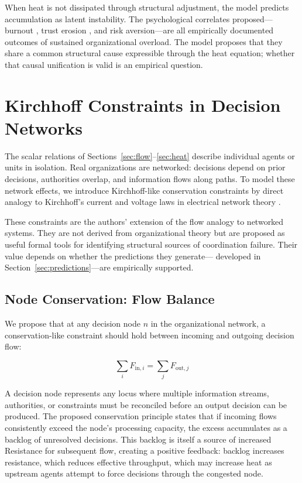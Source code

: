 \documentclass[12pt]{article}
\begin{document}
When heat is not dissipated through structural adjustment, the model
predicts accumulation as latent instability. The psychological correlates
proposed---burnout \citep{maslach1981measurement}, trust erosion
\citep{mayer1995integrative}, and risk aversion---are all empirically
documented outcomes of sustained organizational overload. The model proposes
that they share a common structural cause expressible through the heat
equation; whether that causal unification is valid is an empirical question.

\section{Kirchhoff Constraints in Decision Networks}
\label{sec:kirchhoff}

The scalar relations of Sections~\ref{sec:flow}--\ref{sec:heat} describe
individual agents or units in isolation. Real organizations are networked:
decisions depend on prior decisions, authorities overlap, and information
flows along paths. To model these network effects, we introduce
Kirchhoff-like conservation constraints by direct analogy to Kirchhoff's
current and voltage laws in electrical network theory \citep{feynman1963lectures}.

These constraints are the authors' extension of the flow analogy to networked
systems. They are not derived from organizational theory but are proposed
as useful formal tools for identifying structural sources of coordination
failure. Their value depends on whether the predictions they generate---
developed in Section~\ref{sec:predictions}---are empirically supported.

\subsection{Node Conservation: Flow Balance}

We propose that at any decision node $n$ in the organizational network,
a conservation-like constraint should hold between incoming and outgoing
decision flow:

\[
\sum_{i} F_{\text{in},i} = \sum_{j} F_{\text{out},j}
\]

A decision node represents any locus where multiple information streams,
authorities, or constraints must be reconciled before an output decision
can be produced. The proposed conservation principle states that if incoming
flows consistently exceed the node's processing capacity, the excess
accumulates as a backlog of unresolved decisions. This backlog is itself a
source of increased Resistance for subsequent flow, creating a positive
feedback: backlog increases resistance, which reduces effective throughput,
which may increase heat as upstream agents attempt to force decisions through
the congested node.
\end{document}

